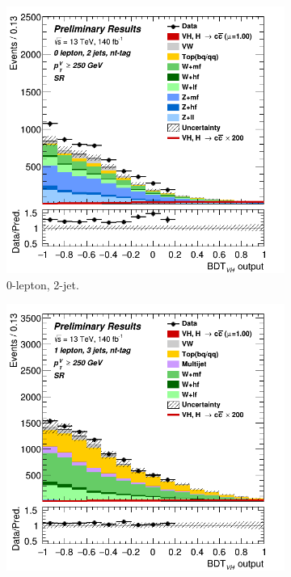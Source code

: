 \begin{figure}[h!]
  \centering
  \begin{subfigure}[b]{0.32\textwidth}
      \centering
      \includegraphics[width=\textwidth]{Images/VH/Own_fit/prefit_VHcc/Region_distmva_BMin250_DSR_J2_TTypent_T1_L0_Y6051_Prefit.png}
      \caption{0-lepton, 2-jet.}
      \label{fig:plots_VHcc_ex_OL_SR_1C}
  \end{subfigure}
  \begin{subfigure}[b]{0.32\textwidth}
      \centering
      \includegraphics[width=\textwidth]{Images/VH/Own_fit/prefit_VHcc/Region_distmva_BMin250_DSR_J3_TTypent_T1_L1_Y6051_Prefit.png}

\end{subfigure}
\end{figure}
